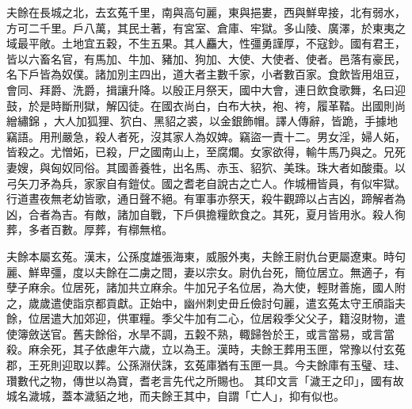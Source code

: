 \begin{pinyinscope}
 
 
 夫餘在長城之北，去玄菟千里，南與高句麗，東與挹婁，西與鮮卑接，北有弱水，方可二千里。戶八萬，其民土著，有宮室、倉庫、牢獄。多山陵、廣澤，於東夷之域最平敞。土地宜五穀，不生五果。其人麤大，性彊勇謹厚，不寇鈔。國有君王，皆以六畜名官，有馬加、牛加、豬加、狗加、大使、大使者、使者。邑落有豪民，名下戶皆為奴僕。諸加別主四出，道大者主數千家，小者數百家。食飲皆用俎豆，會同、拜爵、洗爵，揖讓升降。以殷正月祭天，國中大會，連日飲食歌舞，名曰迎鼓，於是時斷刑獄，解囚徒。在國衣尚白，白布大袂，袍、袴，履革鞜。出國則尚繒繡錦𦋺，大人加狐狸、狖白、黑貂之裘，以金銀飾帽。譯人傳辭，皆跪，手據地竊語。用刑嚴急，殺人者死，沒其家人為奴婢。竊盜一責十二。男女淫，婦人妬，皆殺之。尤憎妬，已殺，尸之國南山上，至腐爛。女家欲得，輸牛馬乃與之。兄死妻嫂，與匈奴同俗。其國善養牲，出名馬、赤玉、貂狖、美珠。珠大者如酸棗。以弓矢刀矛為兵，家家自有鎧仗。國之耆老自說古之亡人。作城柵皆員，有似牢獄。行道晝夜無老幼皆歌，通日聲不絕。有軍事亦祭天，殺牛觀蹄以占吉凶，蹄解者為凶，合者為吉。有敵，諸加自戰，下戶俱擔糧飲食之。其死，夏月皆用氷。殺人徇葬，多者百數。厚葬，有槨無棺。
 
 
 
 
夫餘本屬玄菟。漢末，公孫度雄張海東，威服外夷，夫餘王尉仇台更屬遼東。時句麗、鮮卑彊，度以夫餘在二虜之間，妻以宗女。尉仇台死，簡位居立。無適子，有孽子麻余。位居死，諸加共立麻余。牛加兄子名位居，為大使，輕財善施，國人附之，歲歲遣使詣京都貢獻。正始中，幽州刺史毌丘儉討句麗，遣玄菟太守王頎詣夫餘，位居遣大加郊迎，供軍糧。季父牛加有二心，位居殺季父父子，籍沒財物，遣使簿斂送官。舊夫餘俗，水旱不調，五糓不熟，輙歸咎於王，或言當易，或言當殺。麻余死，其子依慮年六歲，立以為王。漢時，夫餘王葬用玉匣，常豫以付玄菟郡，王死則迎取以葬。公孫淵伏誅，玄菟庫猶有玉匣一具。今夫餘庫有玉璧、珪、瓚數代之物，傳世以為寶，耆老言先代之所賜也。
 其印文言「濊王之印」，國有故城名濊城，蓋本濊貊之地，而夫餘王其中，自謂「亡人」，抑有似也。
 
 
\end{pinyinscope}